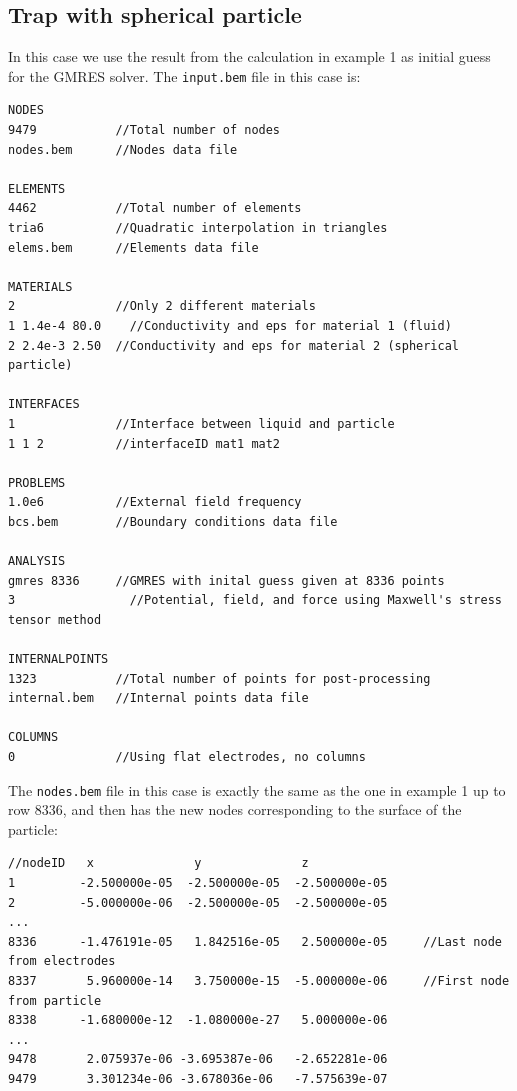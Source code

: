 \documentclass[12pt]{article}
\begin{document}
\subsection{Trap with spherical particle}
In this case we use the result from the calculation in example 1 as initial guess for the GMRES solver. The \verb+input.bem+ file in this case is:

\small\begin{verbatim}
NODES
9479           //Total number of nodes
nodes.bem      //Nodes data file

ELEMENTS
4462           //Total number of elements
tria6          //Quadratic interpolation in triangles
elems.bem      //Elements data file

MATERIALS
2              //Only 2 different materials
1 1.4e-4 80.0	 //Conductivity and eps for material 1 (fluid)
2 2.4e-3 2.50  //Conductivity and eps for material 2 (spherical particle)

INTERFACES
1              //Interface between liquid and particle
1 1 2          //interfaceID mat1 mat2

PROBLEMS
1.0e6          //External field frequency
bcs.bem        //Boundary conditions data file

ANALYSIS
gmres 8336     //GMRES with inital guess given at 8336 points
3	             //Potential, field, and force using Maxwell's stress tensor method

INTERNALPOINTS
1323           //Total number of points for post-processing
internal.bem   //Internal points data file

COLUMNS
0              //Using flat electrodes, no columns
\end{verbatim}\normalsize

The \verb+nodes.bem+ file in this case is exactly the same as the one in example 1 up to row 8336, and then has the new nodes corresponding to the surface of the particle:

\small\begin{verbatim}
//nodeID   x              y              z
1         -2.500000e-05  -2.500000e-05  -2.500000e-05
2         -5.000000e-06  -2.500000e-05  -2.500000e-05
...
8336      -1.476191e-05   1.842516e-05   2.500000e-05     //Last node from electrodes
8337       5.960000e-14   3.750000e-15  -5.000000e-06     //First node from particle
8338      -1.680000e-12  -1.080000e-27   5.000000e-06
...
9478       2.075937e-06 -3.695387e-06   -2.652281e-06
9479       3.301234e-06 -3.678036e-06   -7.575639e-07
\end{verbatim}\normalsize
\end{document}
